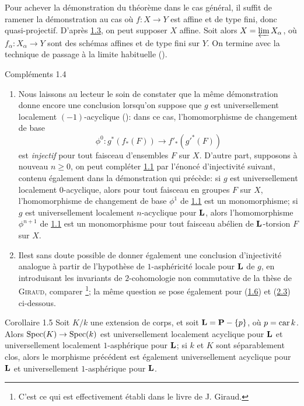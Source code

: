 \documentclass[10pt]{../fichiers-configuration-latex/smfart}
\begin{document}
Pour achever la démonstration du théorème dans le cas général, il
suffit de ramener la démonstration au cas où $f:X\rightarrow Y$ est
affine et de type fini, donc quasi-projectif. D'après \hyperref[XVI.lem1.3]{1.3}, on peut
supposer $X$ affine. Soit alors $X=\varprojlim X_{\alpha}$, où
$f_{\alpha}:X_{\alpha}\rightarrow Y$ sont des schémas affines et de
type fini sur $Y$. On termine avec la technique de passage à la limite
habituelle ().

\begin{enonce*}[remark]{Compléments 1.4}
\begin{enumerate}
\renewcommand{\theenumi}{\alph{enumi}}
\renewcommand{\labelenumi}{\theenumi)}
\item Nous laissons au lecteur le soin de constater que la même
  démonstration donne encore une conclusion lorsqu'on suppose que $g$
  est universellement localement $(-1)$-acyclique (): dans ce
  cas, l'homomorphisme de changement de base
$$
\phi^{0}:g^{\ast}(f_{\ast}(F))\longrightarrow f'_{\ast}({g'}^{\ast}(F))
$$
est \emph{injectif} pour tout faisceau d'ensembles $F$ sur
$X$. D'autre part, supposons à nouveau $n\geq 0$, on peut compléter
\hyperref[XVI.thm1.1]{1.1} par l'énoncé d'injectivité suivant, contenu également dans la
démonstration qui précède: si $g$ est universellement localement
$0$-acyclique, alors pour tout faisceau en groupes $F$ sur $X$,
l'homomorphisme de changement de base $\phi^{1}$ de \hyperref[XVI.thm1.1]{1.1} est un
monomorphisme; si $g$ est universellement localement $n$-acyclique
pour $\mathbf{L}$, alors l'homomorphisme $\phi^{n+1}$ de \hyperref[XVI.thm1.1]{1.1} est un
monomorphisme pour tout faisceau abélien de $\mathbf{L}$-torsion $F$
sur $X$.

\item Il\pageoriginale est sans doute possible de donner également une
  conclusion d'injectivité analogue à partir de l'hypothèse de
  $1$-asphéricité locale pour $\mathbf{L}$ de $g$, en introduisant les
  invariants de $2$-cohomologie non commutative de la thèse de \textsc{Giraud},
  comparer  \footnote[1]{C'est ce qui est effectivement
  établi dans le livre de J. Giraud.}; la même question se pose
  également pour (\hyperref[XVI.cor1.6]{1.6}) et (\hyperref[XVI.cor2.3]{2.3}) ci-dessous.
\end{enumerate}
\end{enonce*}

\begin{enonce*}{Corollaire 1.5}
Soit $K/k$ une extension de corps, et soit
$\mathbf{L}=\mathbf{P}-\{p\}$, où $p= \operatorname{car} k$. Alors $\operatorname{Spec}
(K)\rightarrow \operatorname{Spec} (k)$ est universellement localement acyclique
pour $\mathbf{L}$ et universellement localement $1$-asphérique pour
$\mathbf{L}$; si $k$ et $K$ sont séparablement clos, alors le
morphisme précédent est également universellement acyclique pour
$\mathbf{L}$ et universellement $1$-asphérique pour $\mathbf{L}$.
\end{enonce*}
\end{document}

